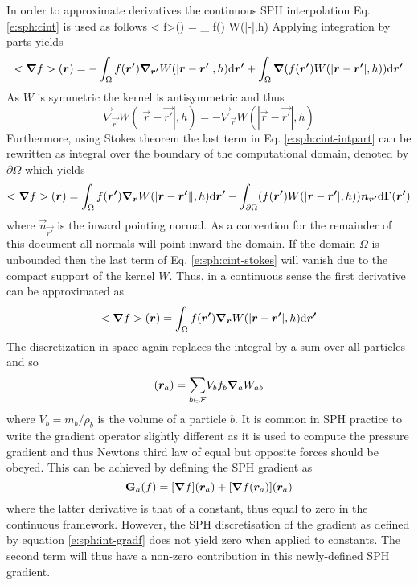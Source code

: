 \documentclass{../GPUSPHtemplate}
\begin{document}
In order to approximate derivatives the continuous SPH interpolation Eq.
\eqref{e:sph:cint} is used as follows
\be
<\vec{\nabla} f>() = \int_\Omega \vec{\nabla} f() W(|-|,h) \td {}
\label{e:sph:cint-gradf-start}
\en
Applying integration by parts yields
\begin{equation}
<\bm{\nabla} f>(\bm{r}) = - \int_\Omega f(\bm{r'}) \bm{\nabla}_{\bm{r'}} W(|\bm{r}-\bm{r'}|,h) \text{d} \bm{r'} +
\int_\Omega \bm{\nabla} (f(\bm{r'}) W(|\bm{r}-\bm{r'}|,h)) \text{d} \bm{r'}
\label{e:sph:cint-intpart}
\end{equation}
As $W$ is symmetric the kernel is antisymmetric and thus
\begin{equation}
\vec{\nabla}_{\vec{r'}} W(|\vec{r}-\vec{r'}|,h) = - \vec{\nabla}_{\vec{r}} W(|\vec{r}-\vec{r'}|,h)
\label{e:sph:kernel-asym} \end{equation}
Furthermore, using Stokes
theorem the last term in Eq. \eqref{e:sph:cint-intpart} can be rewritten
as integral over the boundary of the computational domain, denoted by
$\partial \Omega$ which yields
\begin{equation}
<\bm{\nabla} f>(\bm{r}) = \int_\Omega f(\bm{r'}) \bm{\nabla}_{\bm{r}} W(|\bm{r}-\bm{r'}\|,h) \text{d} \bm{r'} -
\int_{\partial\Omega} (f(\bm{r'}) W(|\bm{r}-\bm{r'}|,h)) \bm{n}_{\bm{r'}} \text{d} \bm{\Gamma}(\bm{r'})
\label{e:sph:cint-stokes}
\end{equation}
where $\vec{n}_{\vec{r'}}$ is the inward pointing normal. As a convention for
the remainder of this document all normals will point inward the domain.
If the domain $\Omega$ is unbounded then the last term of Eq.
\eqref{e:sph:cint-stokes} will vanish due to the compact support of the
kernel $W$. Thus, in a continuous sense the first derivative can be
approximated as
\begin{equation}
<\bm{\nabla} f>(\bm{r}) = \int_\Omega f(\bm{r'}) \bm{\nabla}_{\bm{r}} W(|\bm{r}-\bm{r'}|,h) \text{d} \bm{r'}
\label{e:sph:cint-gradf}
\end{equation}
The discretization in space again replaces the integral by a sum over
all particles and so
\begin{equation}
[\vec{\nabla} f](\vec{r}_a) = \sumF V_b f_b \vec{\nabla}_a W_{ab}
\label{e:sph:int-gradf}
\end{equation}
where $V_b = m_b/\rho_b$ is the volume of a particle $b$. It is common
in SPH practice to write the gradient operator slightly different as it
is used to compute the pressure gradient and thus Newtons third law of
equal but opposite forces should be obeyed. This can be achieved by
defining the SPH gradient as
\begin{equation}
\textbf{G}_a(f) = [\bm{\nabla} f](\bm{r}_a) + [\bm{\nabla} f(\bm{r}_a)](\bm{r}_a)
\label{e:sph:grad-def}
\end{equation}
where the latter derivative is that of a constant, thus equal to zero in the
continuous framework. However, the SPH discretisation of the
gradient as defined by equation \eqref{e:sph:int-gradf} does not
yield zero when applied to constants. 
The second term will thus have a non-zero contribution in this newly-defined
SPH gradient.
\end{document}
